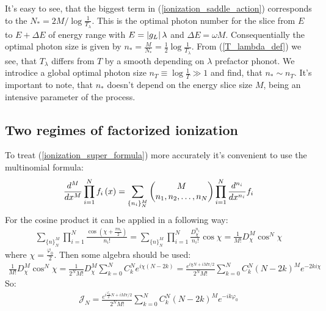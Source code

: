 It's easy to see, that the biggest term in (\ref{ionization_saddle_action}) corresponds to the $ N_*=2M/\log\frac{1}{T_\lambda} $. This is the optimal photon number  for the slice  from $ E $ to $ E+\Delta E $ of energy range with $ E=\left|g_L\right|\lambda  $ and $ \Delta E = \omega M $. Consequentially the optimal photon size is given by $ n_*=\frac{M}{N_*}=\frac{1}{2}\log\frac{1}{T_\lambda} $. From (\ref{T_lambda_def}) we see, that $ T_\lambda $ differs from $ T $ by a smooth depending on $ \lambda $ prefactor phonot. We introdice a global optimal photon size $ n_T\equiv\log\frac{1}{T} \gg1$ and find, that $ n_* \sim n_T $. It's important to note, that $ n_* $ doesn't depend on the energy slice size $ M $, being an intensive parameter of the process.

\subsection{Two regimes of factorized ionization}
To treat (\ref{ionization_super_formula}) more accurately it's convenient to use the multinomial formula:
\begin{gather}
	\frac{d^M}{dx^M}
	\prod_{i=1}^N f_i\left(x\right)
	=
	\sum_{\{n_i\}_{N}^{M}}
	\begin{pmatrix}
	M
	\\
	n_1,n_2,\dots,n_N
	\end{pmatrix}
	\prod_{i=1}^N
	\frac{d^{n_i}}{dx^{n_i}}
	f_i
\end{gather}
For the cosine product it can be applied in a following way:
\begin{gather}
	\sum_{\{n\}_{N}^{M}}\prod_{i=1}^{N}\frac{\cos(\chi+\frac{\pi n_{i}}{2})}{n_{i}!}=\sum_{\{n\}_{N}^{M}}\prod_{i=1}^{N}\frac{D_{\chi}^{n_{i}}}{n_{i}!}\cos\chi=\frac{1}{M!}D_{\chi}^{M}\cos^{N}\chi
\end{gather}
where $ \chi=\frac{\varphi_0 }{2}$. Then some algebra should be used:
\begin{multline}
\label{after_multinomial}
	\frac{1}{M!}D_{\chi}^{M}\cos^{N}\chi=
	\frac{1}{2^{N}M!}D_{\chi}^{M}\sum_{k=0}^{N}C_{k}^{N}e^{i\chi(N-2k)}
	=
	\frac{e^{i\chi N+iM\pi/2}}{2^{N}M!}\sum_{k=0}^{N}C_{k}^{N}(N-2k)^{M}e^{-2ki\chi}
\end{multline}
So:
\begin{gather}
\label{sum_after_multinomial}
	\mathcal{J}_N
	=
		\frac{e^{i\frac{\varphi_0}{2} N+iM\pi/2}}{2^{N}M!}\sum_{k=0}^{N}C_{k}^{N}(N-2k)^{M}e^{-ik\varphi_0}
\end{gather}

